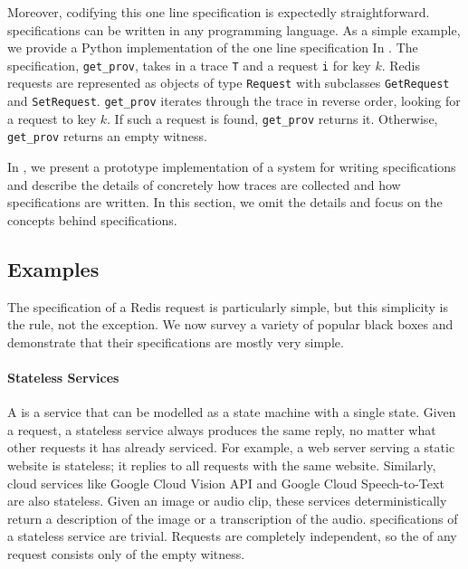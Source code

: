 Moreover, codifying this one line \watprovenance{} specification is expectedly
straightforward. \Watprovenance{} specifications can be written in any
programming language. As a simple example, we provide a Python implementation
of the one line \watprovenance{} specification In .  The
specification, \texttt{get\_prov}, takes in a trace \texttt{T} and a \kvget{}
request \texttt{i} for key $k$. Redis requests are represented as objects of
type \texttt{Request} with subclasses \texttt{GetRequest} and
\texttt{SetRequest}.  \texttt{get\_prov} iterates through the trace in reverse
order, looking for a \kvset{} request to key $k$. If such a \kvset{} request is
found, \texttt{get\_prov} returns it. Otherwise, \texttt{get\_prov} returns an
empty witness.

{}

In , we present a prototype implementation of a system for
writing \watprovenance{} specifications and describe the details of concretely
how traces are collected and how \watprovenance{} specifications are written.
In this section, we omit the details and focus on the concepts behind
\watprovenance{} specifications.

\subsection{Examples}
The \watprovenance{} specification of a Redis \kvget{} request is particularly
simple, but 
this simplicity is the rule, not the exception. We now survey a
variety of popular black boxes and demonstrate that their \watprovenance{}
specifications are mostly very simple.

\paragraph{Stateless Services}
A  is a service that can be modelled as a state
machine with a single state. Given a request, a stateless service always
produces the same reply, no matter what other requests it has already serviced.
For example, a web server serving a static website is stateless; it replies to
all requests with the same website. Similarly, cloud services like Google Cloud
Vision API and Google Cloud Speech-to-Text are also stateless. Given an image
or audio clip, these services deterministically return a description of the
image or a transcription of the audio. \Watprovenance{} specifications of a
stateless service are trivial. Requests are completely independent, so the
\watprovenance{} of any request consists only of the empty witness. 

